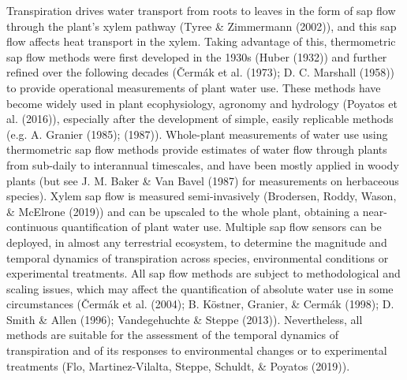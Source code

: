 \documentclass[11pt,twoside]{reedthesis}
\begin{document}
Transpiration drives water transport from roots to leaves in the form of
sap flow through the plant's xylem pathway (Tyree \& Zimmermann (2002)),
and this sap flow affects heat transport in the xylem. Taking advantage
of this, thermometric sap flow methods were first developed in the 1930s
(Huber (1932)) and further refined over the following decades (Čermák et
al. (1973); D. C. Marshall (1958)) to provide operational measurements
of plant water use. These methods have become widely used in plant
ecophysiology, agronomy and hydrology (Poyatos et al. (2016)),
especially after the development of simple, easily replicable methods
(e.g. A. Granier (1985); (1987)). Whole-plant measurements of water use
using thermometric sap flow methods provide estimates of water flow
through plants from sub-daily to interannual timescales, and have been
mostly applied in woody plants (but see J. M. Baker \& Van Bavel (1987)
for measurements on herbaceous species). Xylem sap flow is measured
semi-invasively (Brodersen, Roddy, Wason, \& McElrone (2019)) and can be
upscaled to the whole plant, obtaining a near-continuous quantification
of plant water use. Multiple sap flow sensors can be deployed, in almost
any terrestrial ecosystem, to determine the magnitude and temporal
dynamics of transpiration across species, environmental conditions or
experimental treatments. All sap flow methods are subject to
methodological and scaling issues, which may affect the quantification
of absolute water use in some circumstances (Čermák et al. (2004); B.
Köstner, Granier, \& Cermák (1998); D. Smith \& Allen (1996);
Vandegehuchte \& Steppe (2013)). Nevertheless, all methods are suitable
for the assessment of the temporal dynamics of transpiration and of its
responses to environmental changes or to experimental treatments (Flo,
Martinez-Vilalta, Steppe, Schuldt, \& Poyatos (2019)).\par
\end{document}
